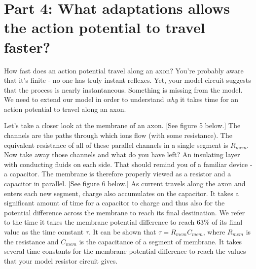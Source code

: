 \section*{Part 4: What adaptations allows the action potential to travel faster?}
How fast does an action potential travel along an axon?
You're probably aware that it's finite - no one has truly instant reflexes.
Yet, your model circuit suggests that the process is nearly instantaneous.
Something is missing from the model.
We need to extend our model in order to understand \emph{why} it takes time for an action potential to travel along an axon.
\par 
Let's take a closer look at the membrane of an axon.
[See figure 5 below.]
The channels are the paths through which ions flow (with some resistance).
The equivalent resistance of all of these parallel channels in a single segment is $R_{mem}$.
Now take away those channels and what do you have left?
An insulating layer with conducting fluids on each side.
That should remind you of a familiar device - a capacitor.
The membrane is therefore properly viewed as a resistor and a capacitor in parallel.
[See figure 6 below.]
As current travels along the axon and enters each new segment, charge also accumulates on the capacitor.
It takes a significant amount of time for a capacitor to charge and thus also for the potential difference across the membrane to reach its final destination.
We refer to the time it takes the membrane potential difference to reach 63\% of its final value as the time constant $\tau$.
It can be shown that $\tau = R_{mem}C_{mem}$, where $R_{mem}$ is the resistance and $C_{mem}$ is the capacitance of a segment of membrane.
It takes several time constants for the membrane potential difference to reach the values that your model resistor circuit gives.

